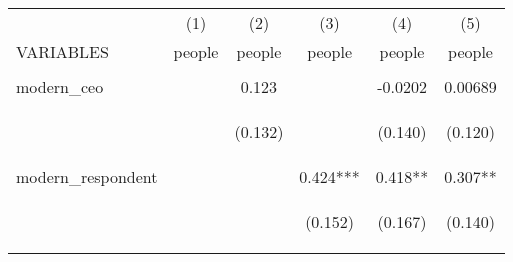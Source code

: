 \begin{center}
\begin{tabular}{lccccc} \hline
 & (1) & (2) & (3) & (4) & (5) \\
VARIABLES & people & people & people & people & people \\ \hline
\vspace{4pt} & \begin{footnotesize}\end{footnotesize} & \begin{footnotesize}\end{footnotesize} & \begin{footnotesize}\end{footnotesize} & \begin{footnotesize}\end{footnotesize} & \begin{footnotesize}\end{footnotesize} \\
modern\_ceo &  & 0.123 &  & -0.0202 & 0.00689 \\
\vspace{4pt} & \begin{footnotesize}\end{footnotesize} & \begin{footnotesize}(0.132)\end{footnotesize} & \begin{footnotesize}\end{footnotesize} & \begin{footnotesize}(0.140)\end{footnotesize} & \begin{footnotesize}(0.120)\end{footnotesize} \\
modern\_respondent &  &  & 0.424*** & 0.418** & 0.307** \\
\vspace{4pt} & \begin{footnotesize}\end{footnotesize} & \begin{footnotesize}\end{footnotesize} & \begin{footnotesize}(0.152)\end{footnotesize} & \begin{footnotesize}(0.167)\end{footnotesize} & \begin{footnotesize}(0.140)\end{footnotesize} \\

\end{tabular}
\end{center}
